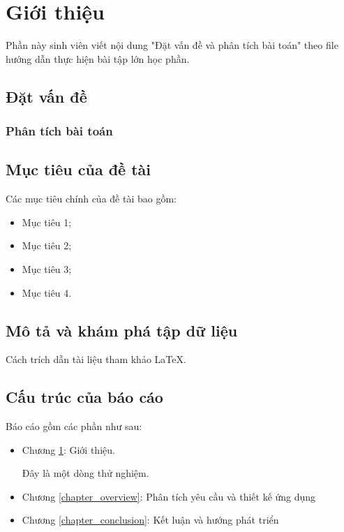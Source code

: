 \chapter {Giới thiệu}\label{chapter_intro}

Phần này sinh viên viết nội dung "Đặt vấn đề và phân tích bài toán" theo file hướng dẫn thực hiện bài tập lớn học phần.

\section{Đặt vấn đề}

\subsection{Phân tích bài toán}

\section{Mục tiêu của đề tài}

Các mục tiêu chính của đề tài bao gồm:
\begin{itemize}
\item Mục tiêu 1;
\item Mục tiêu 2;
\item Mục tiêu 3;
\item Mục tiêu 4.
\end{itemize}

\section{Mô tả và khám phá tập dữ liệu}

Cách trích dẫn tài liệu tham khảo \LaTeX \cite{van2010documentation}.

\section{Cấu trúc của báo cáo}
Báo cáo gồm các phần như sau:
\begin{itemize}
\item Chương \ref{chapter_intro}: Giới thiệu. 

Đây là một dòng thử nghiệm.
\item Chương \ref{chapter_overview}: Phân tích yêu cầu và thiết kế ứng dụng
\item Chương \ref{chapter_conclusion}: Kết luận và hướng phát triển
\end{itemize}
